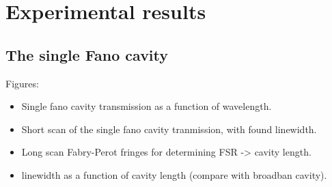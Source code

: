 \section{Experimental results}

\subsection{The single Fano cavity}

Figures:
\begin{itemize}
    \item Single fano cavity transmission as a function of wavelength.
    \item Short scan of the single fano cavity tranmission, with found linewidth.
    \item Long scan Fabry-Perot fringes for determining FSR -> cavity length. 
    \item linewidth as a function of cavity length (compare with broadban cavity).
\end{itemize}


